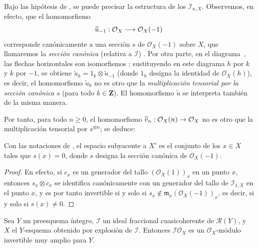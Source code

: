 \documentclass[oneside,10pt]{amsart}
\makeatletter
\renewcommand{\geq}{\geqslant}
\newcommand{\ega@arrow}[2]{\mathchoice{#1}{#2}{#2}{#2}}
\renewcommand{\to}{\ega@arrow{\longrightarrow}{\rightarrow}}
\let\EGAOriginalLabel\label
\renewcommand{\label}[1]{\phantomsection\EGAOriginalLabel{#1}}
\makeatother
\begin{document}
\begin{env}[8.1.9]
\label{II.8.1.9-fr}
Bajo las hipótesis de , se puede precisar la estructura de los $\mathcal{I}_{n,X}$.
Observemos, en efecto, que el homomorfismo
\[
  \widetilde{u}_{-1}:\mathcal{O}_X\to\mathcal{O}_X(-1)
\]
corresponde canónicamente a una sección $s$ de $\mathcal{O}_X(-1)$ sobre $X$, que llamaremos la \emph{sección canónica} (relativa a $\mathcal{I}$) .
Por otra parte, en el diagrama~, las flechas horizontales son isomorfismos ; sustituyendo en este diagrama $h$ por $k$ y $k$ por $-1$, se obtiene $\widetilde{u}_k=1_k\otimes\widetilde{u}_{-1}$ (donde $1_h$ designa la identidad de $\mathcal{O}_X(h)$), es decir, el homomorfismo $\widetilde{u}_k$ no es otro que la \emph{multiplicación tensorial por la sección canónica $s$} (para todo $k\in\mathbf{Z}$).
El homomorfismo $\widetilde{u}$  se interpreta también de la misma manera.

Por tanto, para todo $n\geq0$, el homomorfismo $\widetilde{v}_n:\mathcal{O}_X(n)\to\mathcal{O}_X$ no es otro que la multiplicación tensorial por $s^{\otimes n}$; se deduce:
\end{env}

\begin{corollary}[8.1.10]
\label{II.8.1.10-fr}
Con las notaciones de , el espacio subyacente a $X'$ es el conjunto de los $x\in X$ tales que $s(x)=0$, donde $s$ designa la sección canónica de $\mathcal{O}_X(-1)$.
\end{corollary}

\begin{proof}
En efecto, si $c_x$ es un generador del tallo $(\mathcal{O}_X(1))_x$ en un punto $x$, entonces $s_x\otimes c_x$ se identifica canónicamente con un generador del tallo de $\mathcal{I}_{1,X}$ en el punto $x$, y es por tanto invertible si y solo si $s_x\notin\mathfrak{m}_x(\mathcal{O}_X(-1))_x$, es decir, si y solo si $s(x)\neq0$.
\end{proof}

\begin{proposition}[8.1.11]
\label{II.8.1.11-fr}
Sea $Y$ un preesquema íntegro, $\mathcal{I}$ un ideal fraccional cuasicoherente de $\mathcal{R}(Y)$, y $X$ el $Y$-esquema obtenido por explosión de $\mathcal{I}$.
Entonces $\mathcal{I}\mathcal{O}_X$ es un $\mathcal{O}_X$-módulo invertible muy amplio para $Y$.
\end{proposition}
\end{document}
